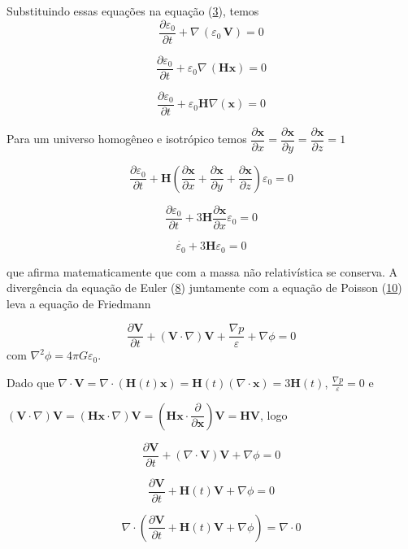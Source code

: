 \documentclass[a4paper,12pt]{article}
\begin{document}
Substituindo essas equações na equação (\hyperref[eq3]{3}), temos
$$\dfrac{\partial \varepsilon_0}{\partial t} +\nabla \,(\varepsilon_0 \, \textbf{V}) = 0$$

$$\dfrac{\partial \varepsilon_0}{\partial t} +\varepsilon_0\nabla \,( \mathbf{H} \mathbf{x}) = 0$$

$$\dfrac{\partial \varepsilon_0}{\partial t} +\varepsilon_0\mathbf{H}\nabla(\mathbf{x}) = 0$$

Para um universo homogêneo e isotrópico temos $\dfrac{\partial\mathbf{x}}{\partial x}=\dfrac{\partial\mathbf{x}}{\partial y} =\dfrac{\partial\mathbf{x}}{\partial z} = 1$

$$\dfrac{\partial \varepsilon_0}{\partial t} +\mathbf{H}\left(\dfrac{\partial\mathbf{x}}{\partial x}+\dfrac{\partial\mathbf{x}}{\partial y} +\dfrac{\partial\mathbf{x}}{\partial z} \right)\varepsilon_0 = 0$$

$$\dfrac{\partial \varepsilon_0}{\partial t} +3\mathbf{H} \dfrac{\partial\mathbf{x}}{\partial x}\varepsilon_0= 0$$

\begin{equation}\label{eq33}
	\dot{\varepsilon_0} + 3 \mathbf{H}\varepsilon_0 = 0 
\end{equation}

que afirma matematicamente que com a massa não relativística se conserva. A divergência da equação de Euler (\hyperref[eq8]{8}) juntamente com a equação de Poisson (\hyperref[eq10]{10}) leva a equação de Friedmann 

 $$\dfrac{\partial \textbf{V} }{\partial t} + (\textbf{V} \cdot \nabla ) \textbf{V} + \frac{\nabla p}{\varepsilon} + \nabla \phi =0$$ com $\nabla^2\phi = 4\pi G\varepsilon_0$.

Dado que $\nabla\cdot\mathbf{V} = \nabla \cdot (\mathbf{H}(t)\mathbf{x}) = \mathbf{H}(t) (\nabla\cdot\mathbf{x}) = 3\mathbf{H}(t)$, $\frac{\nabla p}{\varepsilon} = 0$ e

 $(\mathbf{V}\cdot\nabla)\mathbf{V} = (\mathbf{H}\mathbf{x}\cdot\nabla)\mathbf{V}=(\mathbf{H}\mathbf{x}\cdot\dfrac{\partial }{\partial \mathbf{x}})\mathbf{V}= \mathbf{H}\mathbf{V}$, logo


$$\dfrac{\partial \textbf{V} }{\partial t} + ( \nabla\cdot\textbf{V} ) \textbf{V}   + \nabla \phi =0$$

$$\dfrac{\partial \textbf{V} }{\partial t} +\mathbf{H}(t)\mathbf{V}  + \nabla \phi =0$$

 $$\nabla\cdot \left(\dfrac{\partial \textbf{V} }{\partial t} +\mathbf{H}(t)\mathbf{V}  + \nabla \phi \right) =\nabla\cdot0$$
 
\end{document}
